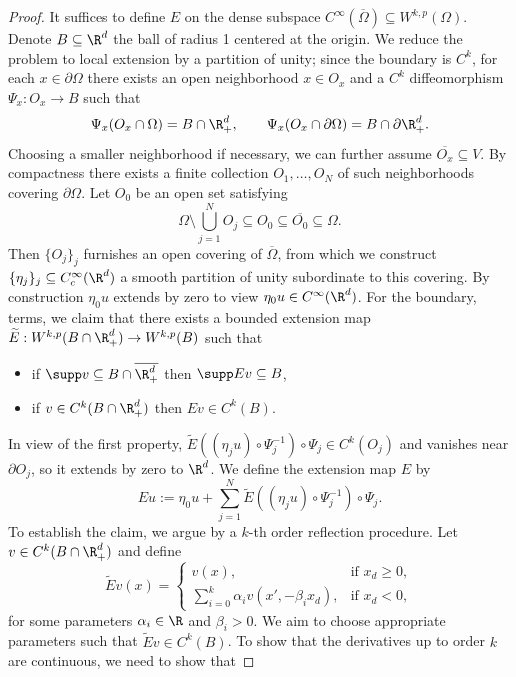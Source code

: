 \documentclass[reqno]{amsart}
\theoremstyle{definition}
\theoremstyle{remark}
\begin{document}
\begin{proof}
	It suffices to define $E$ on the dense subspace $C^\infty (\overline \Omega) \subseteq W^{k, p} (\Omega)$. Denote $B \subseteq \R^d$ the ball of radius 1 centered at the origin. We reduce the problem to local extension by a partition of unity; since the boundary is $C^k$, for each $x \in \partial \Omega$ there exists an open neighborhood $x \in O_x$ and a $C^k$ diffeomorphism $\Psi_x : O_x \to B$ such that 
		\[ \Psi_x (O_x \cap \Omega)  = B \cap \R^d_+, \qquad \Psi_x (O_x \cap \partial\Omega)  = B \cap \partial\R^d_+. \]
	Choosing a smaller neighborhood if necessary, we can further assume $\overline{O_x} \subseteq V$. By compactness there exists a finite collection $O_1, \dots, O_N$ of such neighborhoods covering $\partial \Omega$. 	Let $O_0$ be an open set satisfying
		\[ \Omega \setminus \bigcup_{j = 1}^N O_j \subseteq O_0 \subseteq \overline{O_0} \subseteq \Omega.  \]
	Then $\{O_j\}_j$ furnishes an open covering of $\overline \Omega$, from which we construct $\{ \eta_j \}_j \subseteq C^\infty_c (\R^d)$ a smooth partition of unity subordinate to this covering. By construction $\eta_0 u$ extends by zero to view $\eta_0 u \in C^\infty (\R^d)$. For the boundary, terms, we claim that there exists a bounded extension map $\widetilde E: W^{k, p} (B \cap \R^d_+) \to W^{k, p} (B)$ such that
	\begin{itemize}
		\item if $\supp v \subseteq B \cap \overline{\R^d_+}$ then $\supp Ev \subseteq B$, 
		\item if $v \in C^k (B \cap \R^d_+)$ then $Ev \in C^k (B)$. 
	\end{itemize}
	In view of the first property, $\widetilde E((\eta_j u) \circ \Psi_j^{-1}) \circ \Psi_j \in C^k (O_j)$ and vanishes near $\partial O_j$, so it extends by zero to $\R^d$. We define the extension map $E$ by 
		\[ E u := \eta_0 u + \sum_{j = 1}^N \widetilde E((\eta_j u) \circ \Psi_j^{-1}) \circ \Psi_j. \]
	To establish the claim, we argue by a $k$-th order reflection procedure. Let $v \in C^k (B \cap \R^d_+)$ and define
		\[
			\widetilde E v (x)
				=
				\begin{cases}
					v(x) , 				&\text{if } x_d \geq 0, \\
					\sum_{i = 0}^k \alpha_i v (x', - \beta_i x_d) , 						&\text{if } x_d < 0,
				\end{cases}
		\]
	for some parameters $\alpha_i \in \R$ and $\beta_i > 0$. We aim to choose appropriate parameters such that $\widetilde E v \in C^k (B)$. To show that the derivatives up to order $k$ are continuous, we need to show that 

\end{proof}
\end{document}
